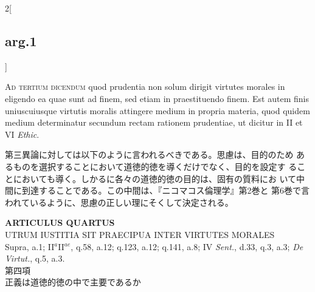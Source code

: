 \documentclass[paper=a4paper,fontsize=10pt,jafontsize=9pt,titlepage]{jlreq}
\begin{document}
\begin{paracol}{2}[\subsection{arg.1}]
\switchcolumn*[\subsection{ad.3}]

{\scshape Ad tertium dicendum} quod prudentia non solum dirigit
virtutes morales in eligendo ea quae sunt ad finem, sed etiam in
praestituendo finem. Est autem finis uniuscuiusque virtutis moralis
attingere medium in propria materia, quod quidem medium determinatur
secundum rectam rationem prudentiae, ut dicitur in II et VI {\itshape
Ethic}.

\switchcolumn

第三異論に対しては以下のように言われるべきである。思慮は、目的のため
 あるものを選択することにおいて道徳的徳を導くだけでなく、目的を設定す
 ることにおいても導く。しかるに各々の道徳的徳の目的は、固有の質料にお
 いて中間に到達することである。この中間は、『ニコマコス倫理学』第2巻と
 第6巻で言われているように、思慮の正しい理にそくして決定される。

\end{paracol}
\newpage
{}
{}
\setcounter{section}{4}
\setcounter{subsection}{0}





\begin{center}
{\Large {\bfseries ARTICULUS QUARTUS}}\\
{\large UTRUM IUSTITIA SIT PRAECIPUA INTER VIRTUTES MORALES}\\
{\footnotesize Supra, a.1; II$^{a}$II$^{ae}$, q.58, a.12; q.123, a.12; q.141, a.8; IV {\itshape Sent.}, d.33, q.3, a.3; {\itshape De Virtut.}, q.5, a.3.}\\
{\Large 第四項\\正義は道徳的徳の中で主要であるか}
\end{center}
\end{document}
